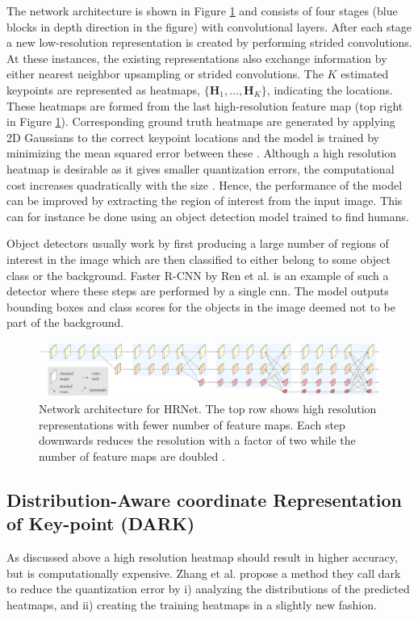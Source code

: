 The network architecture is shown in Figure \ref{fig:hrnet} and consists of four stages (blue blocks in depth direction in the figure) with convolutional layers. After each stage a new low-resolution representation is created by performing strided convolutions. At these instances, the existing representations also exchange information by either nearest neighbor upsampling or strided convolutions. The $K$ estimated keypoints are represented as heatmaps, $\{\mathbf{H}_1, \hdots, \mathbf{H}_K\}$, indicating the locations. These heatmaps are formed from the last high-resolution feature map (top right in Figure \ref{fig:hrnet}). Corresponding ground truth heatmaps are generated by applying 2D Gaussians to the correct keypoint locations and the model is trained by minimizing the mean squared error between these \cite{Sun2019}. Although a high resolution heatmap is desirable as it gives smaller quantization errors, the computational cost increases quadratically with the size \cite{Zhang2020}. Hence, the performance of the model can be improved by extracting the region of interest from the input image. This can for instance be done using an object detection model trained to find humans.

Object detectors usually work by first producing a large number of regions of interest in the image which are then classified to either belong to some object class or the background. Faster R-CNN by Ren et al. \cite{Ren2017} is an example of such a detector where these steps are performed by a single \gls{cnn}. The model outputs bounding boxes and class scores for the objects in the image deemed not to be part of the background.

\begin{figure}
 \centering
 \includegraphics[width=\textwidth]{files/figs/hpe/hrnet.png}
 \caption{Network architecture for HRNet. The top row shows high resolution representations with fewer number of feature maps. Each step downwards reduces the resolution with a factor of two while the number of feature maps are doubled \cite{Wang2020}.}
 \label{fig:hrnet}
\end{figure}


\subsection{Distribution-Aware coordinate Representation of Key-point (DARK)} \label{sec:dark}
As discussed above a high resolution heatmap should result in higher accuracy, but is computationally expensive. Zhang et al. propose a method they call \gls{dark} \cite{Zhang2020} to reduce the quantization error by i) analyzing the distributions of the predicted heatmaps, and ii) creating the training heatmaps in a slightly new fashion.


